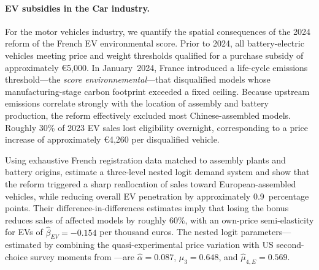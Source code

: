 


\paragraph{EV subsidies in the Car industry.}


For the motor vehicles industry, we quantify the spatial consequences of the 2024 reform of the French EV environmental score. Prior to 2024, all battery-electric vehicles meeting price and weight thresholds qualified for a purchase subsidy of approximately \euro{5,000}. In January~2024, France introduced a life-cycle emissions threshold---the \textit{score environnemental}---that disqualified models whose manufacturing-stage carbon footprint exceeded a fixed ceiling. Because upstream emissions correlate strongly with the location of assembly and battery production, the reform effectively excluded most Chinese-assembled models. Roughly 30\% of 2023 EV sales lost eligibility overnight, corresponding to a price increase of approximately \euro{4,260} per disqualified vehicle.
 
Using exhaustive French registration data matched to assembly plants and battery origins, \cite{MalgouyresMayerNolden2025} estimate a three-level nested logit demand system and show that the reform triggered a sharp reallocation of sales toward European-assembled vehicles, while reducing overall EV penetration by approximately 0.9~percentage points. Their difference-in-differences estimates imply that losing the bonus reduces sales of affected models by roughly 60\%, with an own-price semi-elasticity for EVs of $\hat{\beta}_{EV} = -0.154$ per thousand euros. The nested logit parameters---estimated by combining the quasi-experimental price variation with US second-choice survey moments from \cite{AllcottEtAl2024}---are $\hat{\alpha} = 0.087$, $\hat{\mu}_3 = 0.648$, and $\hat{\mu}_{4,E} = 0.569$.
 
